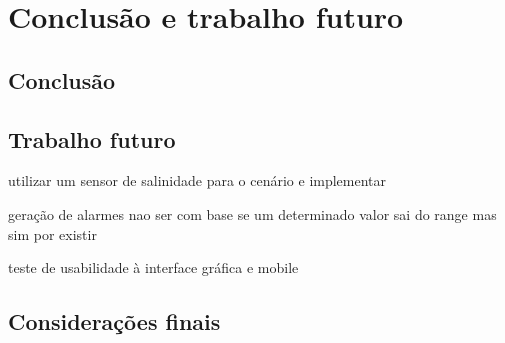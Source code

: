 \chapter{Conclusão e trabalho futuro}


\section{Conclusão}

\section{Trabalho futuro}


utilizar um sensor de salinidade para o cenário e implementar

geração de alarmes nao ser com base se um determinado valor sai do range mas sim por existir 



teste de usabilidade à interface gráfica e mobile 


\section{Considerações finais}
